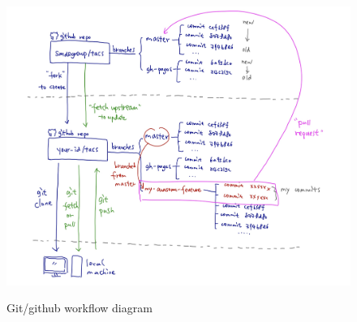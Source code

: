 \documentclass[11pt]{article}
\begin{document}
\clearpage
 \ 
\vfill
\begin{figure}[h]
    \centering
    \includegraphics[width=\textwidth]{pics/cartoon.jpg}
    \label{fig:cartoon}
    \caption{Git/github workflow diagram}
\end{figure}
\vfill


\end{document}
